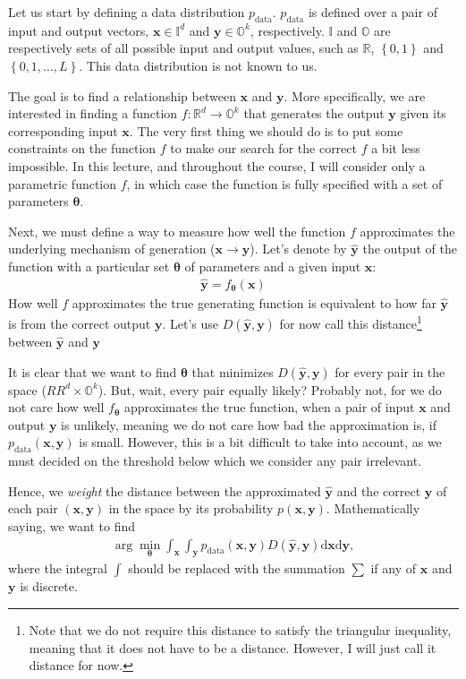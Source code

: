 \documentclass{report}
\newcommand{\vect}[1]{\mathbf{#1}}
\newcommand{\vects}[1]{\boldsymbol{#1}}
\newcommand{\vx}[0]{\vect{x}}
\newcommand{\vy}[0]{\vect{y}}
\newcommand{\TT}[0]{\vects{\theta}}
\newcommand{\RR}[0]{\mathbb{R}}
\newcommand{\OO}[0]{\mathbb{O}}
\newcommand{\II}[0]{\mathbb{I}}
\newcommand{\dd}[1]{\ensuremath{\mbox{d}#1}}
\begin{document}
Let us start by defining a data distribution $p_{\text{data}}$.
$p_{\text{data}}$ is defined over a pair of input and output vectors, $\vx \in
\II^d$ and $\vy \in \OO^k$, respectively. $\II$ and $\OO$ are respectively sets
of all possible input and output values, such as $\RR$, $\left\{ 0, 1\right\}$
and $\left\{0, 1, \ldots, L\right\}$. This data distribution is not known to us.

The goal is to find a relationship between $\vx$ and $\vy$. More specifically,
we are interested in finding a function $f:\RR^d \to \OO^k$ that generates the
output $\vy$ given its corresponding input $\vx$. The very first thing we should
do is to put some constraints on the function $f$ to make our search for the
correct $f$ a bit less impossible. In this lecture, and throughout the course, I
will consider only a parametric function $f$, in which case the function is
fully specified with a set of parameters $\TT$.

Next, we must define a way to measure how well the function $f$ approximates the
underlying mechanism of generation ($\vx \to \vy$). Let's denote by $\hat{\vy}$ the 
output of the function with a particular set $\TT$ of parameters and a given input
$\vx$:
\begin{align*}
    \hat{\vy} = f_{\TT}(\vx)
\end{align*}
How well $f$ approximates the true generating function is equivalent to how far
$\hat{\vy}$ is from the correct output $\vy$. Let's use $D(\hat{\vy}, \vy)$ for
now call this distance\footnote{
    Note that we do not require this distance to satisfy the triangular
    inequality, meaning that it does not have to be a distance. However, I will
    just call it distance for now.
}
between $\hat{\vy}$ and $\vy$

It is clear that we want to find $\TT$ that minimizes $D(\hat{\vy}, \vy)$ for
every pair in the space ($RR^d \times \OO^k$). But, wait, every pair equally
likely? Probably not, for we do not care how well $f_{\TT}$ approximates the
true function, when a pair of input $\vx$ and output $\vy$ is unlikely, meaning
we do not care how bad the approximation is, if $p_\text{data}(\vx, \vy)$ is
small. However, this is a bit difficult to take into account, as we must decided
on the threshold below which we consider any pair irrelevant.

Hence, we {\em weight} the distance between the approximated $\hat{\vy}$ and the
correct $\vy$ of each pair $(\vx, \vy)$ in the space by its probability $p(\vx,
\vy)$. Mathematically saying, we want to find 
\begin{align*}
    \arg\min_{\TT} \int_{\vx} \int_{\vy} p_{\text{data}}(\vx, \vy) D(\hat{\vy}, \vy) \dd{\vx}
    \dd{\vy},
\end{align*}
where the integral $\int$ should be replaced with the summation $\sum$ if any of
$\vx$ and $\vy$ is discrete.
\end{document}
